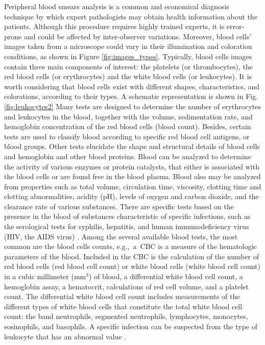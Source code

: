 Peripheral blood smears analysis is a common and economical diagnosis technique by which expert pathologists may obtain health information about the patients. Although this procedure requires highly trained experts, it is error-prone and could be affected by inter-observer variations. Moreover, blood cells' images taken from a microscope could vary in their illumination and coloration conditions, as shown in Figure \ref{fig:images_types}. Typically, blood cells images contain three main components of interest: the platelets (or thrombocytes), the red blood cells (or erythrocytes) and the white blood cells (or leukocytes). It is worth considering that blood cells exist with different shapes, characteristics, and colorations, according to their types. A schematic representation is shown in Fig. \ref{fig:leukocytes2}
Many tests are designed to determine the number of erythrocytes and leukocytes in the blood, together with the volume, sedimentation rate, and hemoglobin concentration of the red blood cells (blood count). Besides, certain tests are used to classify blood according to specific red blood cell antigens, or blood groups. Other tests elucidate the shape and structural details of blood cells and hemoglobin and other blood proteins. Blood can be analyzed to determine the activity of various enzymes or protein catalysts, that either is associated with the blood cells or are found free in the blood plasma.
Blood also may be analyzed from properties such as total volume, circulation time, viscosity, clotting time and clotting abnormalities, acidity (pH), levels of oxygen and carbon dioxide, and the clearance rate of various substances. There are specific tests based on the presence in the blood of substances characteristic of specific infections, such as the serological tests for syphilis, hepatitis, and human immunodeficiency virus (HIV, the AIDS virus) \cite{Brit}.
Among the several available blood tests, the most common are the blood cells counts, \mbox{e.g., a CBC} is a measure of the hematologic parameters of the blood. Included in the CBC is the calculation of the number of red blood cells (red blood cell count) or white blood cells (white blood cell count) in a cubic millimeter (mm$^{3}$) of blood, a differential white blood cell count, a hemoglobin assay, a hematocrit, calculations of red cell volume, and a platelet count. The differential white blood cell count includes measurements of the different types of white blood cells that constitute the total white blood cell count: the band neutrophils, segmented neutrophils, lymphocytes, monocytes, eosinophils, and basophils. A specific infection can be suspected from the type of leukocyte that has an abnormal value \cite{DiRuberto2016}.

